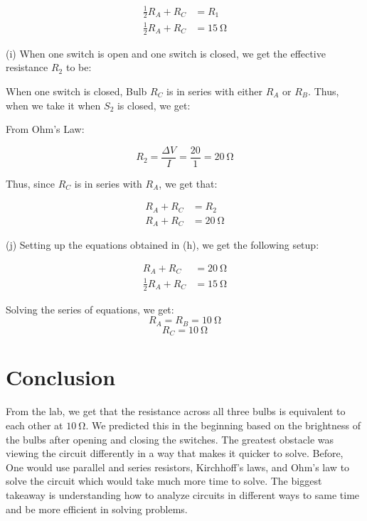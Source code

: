 \documentclass[12pt]{article}
\begin{document}
\begin{equation*}
    \begin{split}
        \frac{1}{2}R_A + R_C & = R_1 \\
        \frac{1}{2}R_A + R_C & = \SI{15}{\ohm}
    \end{split}
\end{equation*}

\bigskip

(i) When one switch is open and one switch is closed, we get the effective resistance $R_2$ to be:

\bigskip

When one switch is closed, Bulb $R_C$ is in series with either $R_A$ or $R_B$. Thus, when we take it when $S_2$ is closed, we get:

\bigskip

From Ohm's Law:

\[R_2 = \frac{\Delta V}{I} = \frac{20}{1} = \SI{20}{\ohm}\]

Thus, since $R_C$ is in series with $R_A$, we get that:

\begin{equation*}
    \begin{split}
        R_A + R_C & = R_2 \\
        R_A + R_C & = \SI{20}{\ohm}
    \end{split}
\end{equation*}

\bigskip

(j) Setting up the equations obtained in (h), we get the following setup:

\begin{equation*}
    \begin{split}
        R_A + R_C & = \SI{20}{\ohm} \\
        \frac{1}{2}R_A + R_C & = \SI{15}{\ohm}
    \end{split}
\end{equation*}

\bigskip

Solving the series of equations, we get:
\[R_A = R_B = \SI{10}{\ohm}\]
\[R_C = \SI{10}{\ohm}\]

\section{Conclusion}
From the lab, we get that the resistance across all three bulbs is equivalent to each other at $\SI{10}{\ohm}$. We predicted this in the beginning based on the brightness of the bulbs after opening and closing the switches. The greatest obstacle was viewing the circuit differently in a way that makes it quicker to solve. Before, One would use parallel and series resistors, Kirchhoff's laws, and Ohm's law to solve the circuit which would take much more time to solve. The biggest takeaway is understanding how to analyze circuits in different ways to same time and be more efficient in solving problems.
\end{document}
